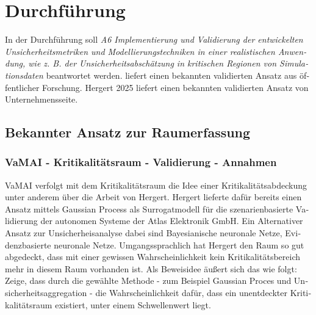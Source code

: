 
\chapter{Durchführung}\label{chapter:durchfuehrung}



\begin{otherlanguage}{american}
  
\end{otherlanguage}



\begin{otherlanguage}{ngerman}

In der Durchführung soll \textit{A6 Implementierung und Validierung der entwickelten Unsicherheitsmetriken
und Modellierungstechniken in einer realistischen Anwendung, wie z. B. der
Unsicherheitsabschätzung in kritischen Regionen von Simulationsdaten} beantwortet werden. \parencite{amini2020deep} liefert einen bekannten validierten Ansatz aus öffentlicher Forschung. Hergert 2025 liefert einen bekannten validierten Ansatz von Unternehmensseite. 

\section*{Bekannter Ansatz zur Raumerfassung}

\subsection*{VaMAI - Kritikalitätsraum - Validierung - Annahmen}

VaMAI verfolgt mit dem Kritikalitätsraum die Idee einer Kritikalitätsabdeckung unter anderem über die Arbeit von Hergert. Hergert lieferte dafür bereits einen Ansatz mittels \glqq{}Gaussian Process\grqq{} als Surrogatmodell für die szenarienbasierte Validierung der autonomen Systeme der Atlas Elektronik GmbH. Ein Alternativer Ansatz zur Unsicherheisanalyse dabei sind \gls{Bayesianische neuronale Netze}, \gls{Evidenzbasierte neuronale Netze}. Umgangssprachlich hat Hergert den Raum so gut abgedeckt, dass mit einer gewissen Wahrscheinlichkeit kein Kritikalitätsbereich mehr in diesem Raum vorhanden ist. Als Beweisidee äußert sich das wie folgt: Zeige, dass durch die gewählte Methode - zum Beispiel Gaussian Proces und Unsicherheitsaggregation - die Wahrscheinlichkeit dafür, dass ein unentdeckter Kritikalitätsraum existiert, unter einem Schwellenwert liegt.


\end{otherlanguage}
